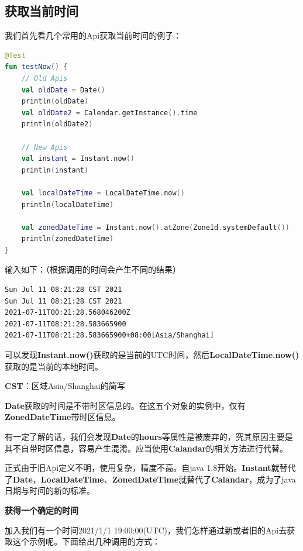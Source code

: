\documentclass[cn,10pt,math=newtx,citestyle=gb7714-2015,bibstyle=gb7714-2015]{elegantbook}
\begin{document}
    \subsection{获取当前时间}

    我们首先看几个常用的Api获取当前时间的例子：

    \begin{lstlisting}[language=Kotlin]
@Test
fun testNow() {
    // Old Apis
    val oldDate = Date()
    println(oldDate)
    val oldDate2 = Calendar.getInstance().time
    println(oldDate2)

    // New Apis
    val instant = Instant.now()
    println(instant)

    val localDateTime = LocalDateTime.now()
    println(localDateTime)

    val zonedDateTime = Instant.now().atZone(ZoneId.systemDefault())
    println(zonedDateTime)
}
    \end{lstlisting}

    输入如下：（根据调用的时间会产生不同的结果）

    \begin{lstlisting}
Sun Jul 11 08:21:28 CST 2021
Sun Jul 11 08:21:28 CST 2021
2021-07-11T00:21:28.568046200Z
2021-07-11T08:21:28.583665900
2021-07-11T08:21:28.583665900+08:00[Asia/Shanghai]
    \end{lstlisting}

    可以发现\textbf{Instant.now()}获取的是当前的UTC时间，然后\textbf{LocalDateTime.now()}获取的是当前的本地时间。

    \begin{note}
        \textbf{CST}：区域Asia/Shanghai的简写

        \textbf{Date}获取的时间是不带时区信息的。在这五个对象的实例中，仅有\textbf{ZonedDateTime}带时区信息。
    \end{note}

    有一定了解的话，我们会发现\textbf{Date}的\textbf{hours}等属性是被废弃的，究其原因主要是其不自带时区信息，容易产生混淆。应当使用\textbf{Calandar}的相关方法进行代替。

    正式由于旧Api定义不明，使用复杂，精度不高。自java 1.8开始。\textbf{Instant}就替代了\textbf{Date}，\textbf{LocalDateTime}、\textbf{ZonedDateTime}就替代了\textbf{Calandar}，成为了java日期与时间的新的标准。

    \textbf{获得一个确定的时间}

    加入我们有一个时间2021/1/1 19:00:00(UTC)，我们怎样通过新或者旧的Api去获取这个示例呢。下面给出几种调用的方式：
\end{document}

